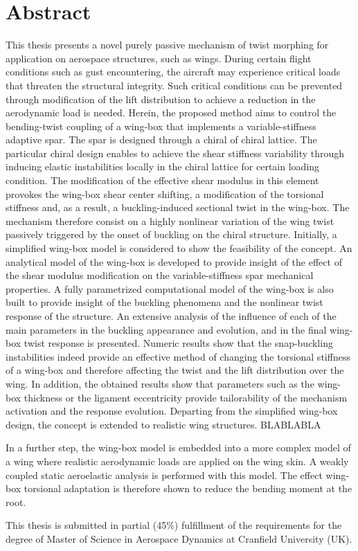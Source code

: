 \section*{Abstract}

This thesis presents a novel purely passive mechanism of twist morphing for application on aerospace structures, such as wings. During certain flight conditions such as gust encountering, the aircraft may experience critical loads that threaten the structural integrity. Such critical conditions can be prevented through modification of the lift distribution to achieve a reduction in the aerodynamic load is needed. Herein, the proposed method aims to control the bending-twist coupling of a wing-box that implements a variable-stiffness adaptive spar. The spar is designed through a chiral of chiral lattice. The particular chiral design enables to achieve the shear stiffness variability through inducing elastic instabilities locally in the chiral lattice for certain loading condition. The modification of the effective shear modulus in this element provokes the wing-box shear center shifting, a modification of the torsional stiffness and, as a result, a buckling-induced sectional twist in the wing-box. The mechanism therefore consist on a highly nonlinear variation of the wing twist passively triggered by the onset of buckling on the chiral structure. Initially, a simplified wing-box model is considered to show the feasibility of the concept. An analytical model of the wing-box is developed to provide insight of the effect of the shear modulus modification on the variable-stiffness spar mechanical properties. A fully parametrized computational model of the wing-box is also built to provide insight of the buckling phenomena and the nonlinear twist response of the structure. An extensive analysis of the influence of each of the main parameters in the buckling appearance and evolution, and in the final wing-box twist response is presented. Numeric results show that the snap-buckling instabilities indeed provide an effective method of changing the torsional stiffness of a wing-box and therefore affecting the twist and the lift distribution over the wing. In addition, the obtained results show that parameters such as the wing-box thickness or the ligament eccentricity provide tailorability of the mechanism activation and the response evolution. Departing from the simplified wing-box design, the concept is extended to realistic wing structures. BLABLABLA

In a further step, the wing-box model is embedded into a more complex model of a wing where realistic aerodynamic loads are applied on the wing skin. A weakly coupled static aeroelastic analysis is performed with this model. The effect wing-box torsional adaptation is therefore shown to reduce the bending moment at the root.

\vfill
\normalsize
\noindent
This thesis is submitted in partial (45\%) fulfillment of the requirements for the degree of Master of Science in Aerospace Dynamics at Cranfield University (UK).